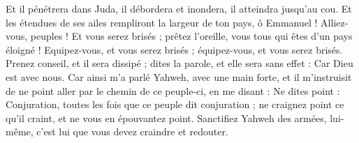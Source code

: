 \begin{multicols}{2}
Et il pénétrera dans Juda, il débordera et inondera, il atteindra jusqu'au cou. Et les étendues de ses ailes rempliront la largeur de ton pays, ô Emmanuel !
Alliez-vous, peuples ! Et vous serez brisés ; prêtez l'oreille, vous tous qui êtes d'un pays éloigné ! Equipez-vous, et vous serez brisés ; équipez-vous, et vous serez brisés.
Prenez conseil, et il sera dissipé ; dites la parole, et elle sera sans effet : Car Dieu est avec nous.
Car ainsi m'a parlé Yahweh, avec une main forte, et il m'instruisit de ne point aller par le chemin de ce peuple-ci, en me disant :
Ne dites point : Conjuration, toutes les fois que ce peuple dit conjuration ; ne craignez point ce qu'il craint, et ne vous en épouvantez point.
Sanctifiez Yahweh des armées, lui-même, c'est lui que vous devez craindre et redouter.

\end{multicols}
